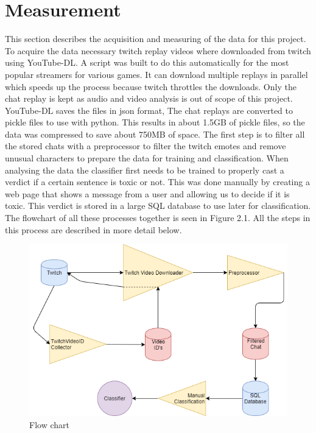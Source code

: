 \documentclass[final]{report}
\begin{document}
\chapter{Measurement}
\label{ch:measurement}

This section describes the acquisition and measuring of the data for this project.
To acquire the data necessary twitch replay videos where downloaded from twitch using YouTube-DL.
A script was built to do this automatically for the most popular streamers for various games. 
It can download multiple replays in parallel which speeds up the process because twitch throttles the downloads.
Only the chat replay is kept as audio and video analysis is out of scope of this project.
YouTube-DL saves the files in json format,  The chat replays are converted to pickle files to use with python. 
This results in about 1.5GB of pickle files, so the data was compressed to save about 750MB of space.
The first step is to filter all the stored chats with a preprocessor to filter the twitch emotes and remove unusual characters to prepare the data for training and classification.
When analysing the data the classifier first needs to be trained to properly cast a verdict if a certain sentence is toxic or not.
This was done manually by creating a web page that shows a message from a user and allowing us to decide if it is toxic. This verdict is stored in a large SQL database to use later for classification. 
The flowchart of all these processes together is seen in Figure 2.1. All the steps in this process are described in more detail below.


\begin{figure}
	\includegraphics[width=\textwidth]{FlowChart.png}
	\caption{Flow chart}
\end{figure}
\end{document}
